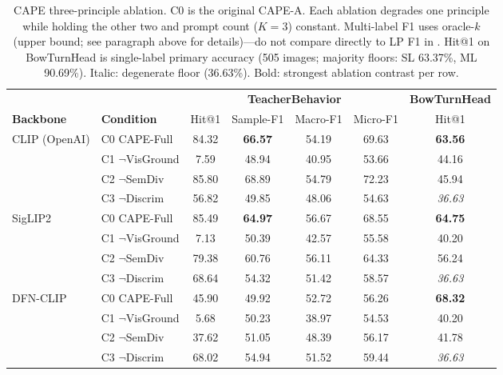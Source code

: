 \documentclass[symmetry,article,submit,pdftex,moreauthors]{Definitions/mdpi}
\begin{document}
\begin{table}[H]
\caption{CAPE three-principle ablation. \textsc{C0} is the original CAPE-A. Each ablation degrades one principle while holding the other two and prompt count ($K=3$) constant. Multi-label F1 uses oracle-$k$ (upper bound; see paragraph above for details)---do not compare directly to LP F1 in . Hit@1 on BowTurnHead is single-label primary accuracy (505 images; majority floors: SL 63.37\%, ML 90.69\%). Italic: degenerate floor (36.63\%). Bold: strongest ablation contrast per row.}
\label{tab:cape_ablation}
\centering
\small
\begin{tabular}{l l cccc c}
\toprule
& & \multicolumn{4}{c}{\textbf{TeacherBehavior}} & \textbf{BowTurnHead} \\
\cmidrule(lr){3-6}\cmidrule(lr){7-7}
\textbf{Backbone} & \textbf{Condition} & Hit@1 & Sample-F1 & Macro-F1 & Micro-F1 & Hit@1 \\
\midrule
\multirow{4}{*}{CLIP (OpenAI)}
 & \textsc{C0} CAPE-Full        & 84.32 & \textbf{66.57} & 54.19 & 69.63 & \textbf{63.56} \\
 & \textsc{C1} $\neg$VisGround  &  7.59 & 48.94 & 40.95 & 53.66 & 44.16 \\
 & \textsc{C2} $\neg$SemDiv     & 85.80 & 68.89 & 54.79 & 72.23 & 45.94 \\
 & \textsc{C3} $\neg$Discrim    & 56.82 & 49.85 & 48.06 & 54.63 & \textit{36.63} \\
\midrule
\multirow{4}{*}{SigLIP2}
 & \textsc{C0} CAPE-Full        & 85.49 & \textbf{64.97} & 56.67 & 68.55 & \textbf{64.75} \\
 & \textsc{C1} $\neg$VisGround  &  7.13 & 50.39 & 42.57 & 55.58 & 40.20 \\
 & \textsc{C2} $\neg$SemDiv     & 79.38 & 60.76 & 56.11 & 64.33 & 56.24 \\
 & \textsc{C3} $\neg$Discrim    & 68.64 & 54.32 & 51.42 & 58.57 & \textit{36.63} \\
\midrule
\multirow{4}{*}{DFN-CLIP}
 & \textsc{C0} CAPE-Full        & 45.90 & 49.92 & 52.72 & 56.26 & \textbf{68.32} \\
 & \textsc{C1} $\neg$VisGround  &  5.68 & 50.23 & 38.97 & 54.53 & 40.20 \\
 & \textsc{C2} $\neg$SemDiv     & 37.62 & 51.05 & 48.39 & 56.17 & 41.78 \\
 & \textsc{C3} $\neg$Discrim    & 68.02 & 54.94 & 51.52 & 59.44 & \textit{36.63} \\
\bottomrule
\end{tabular}
\end{table}
\end{document}
